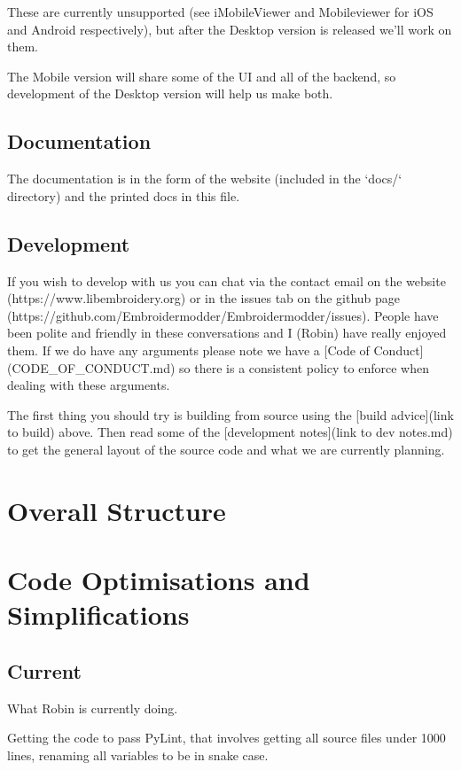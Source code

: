 \documentclass[a4paper]{report}
\begin{document}
These are currently unsupported (see iMobileViewer and Mobileviewer for
iOS and Android respectively), but after the Desktop version is
released we'll work on them.

The Mobile version will share some of the UI and all of the backend,
so development of the Desktop version will help us make both.

\subsection{Documentation}

The documentation is in the form of the website (included in the `docs/`
directory) and the printed docs in this file.

\subsection{Development}

If you wish to develop with us you can chat via the contact email
on the website (https://www.libembroidery.org) or in the issues tab on the
github page (https://github.com/Embroidermodder/Embroidermodder/issues).
People have been polite and friendly in these conversations and I (Robin)
have really enjoyed them.
If we do have any arguments please note we have a
[Code of Conduct](CODE\_OF\_CONDUCT.md) so there is a consistent policy to
enforce when dealing with these arguments.

The first thing you should try is building from source using the [build advice](link to build)
above. Then read some of the [development notes](link to dev notes.md) to get the general
layout of the source code and what we are currently planning.


\section{Overall Structure}

\section{Code Optimisations and Simplifications}

\subsection{Current}

What Robin is currently doing.

Getting the code to pass PyLint, that involves getting all source files
under 1000 lines, renaming all variables to be in snake case.
\end{document}
